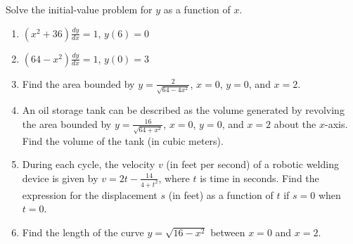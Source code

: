 \documentclass{exercises}
\begin{document}
Solve the initial-value problem for $y$ as a function of $x$.

\begin{enumerate}[resume]
\item $(x^{2}+36)\frac{dy}{dx}=1$, $y(6)=0$
\item $(64-x^{2})\frac{dy}{dx}=1$, $y(0)=3$
\item Find the area bounded by $y=\frac{2}{\sqrt{64-4x^{2}}}$, $x=0$, $y=0$, and $x=2$.
\item An oil storage tank can be described as the volume generated by revolving the area bounded by $y=\frac{16}{\sqrt{64+x^{2}}}$, $x=0$, $y=0$, and $x=2$ about the $x$-axis. Find the volume of the tank (in cubic meters).
\item During each cycle, the velocity $v$ (in feet per second) of a robotic welding device is given by $v=2t-\frac{14}{4+t^{2}}$, where $t$ is time in seconds. Find the expression for the displacement $s$ (in feet) as a function of $t$ if $s=0$ when $t=0$.
\item Find the length of the curve $y=\sqrt{16-x^{2}}$ between $x=0$ and $x=2$.
\end{enumerate}
\end{document}
